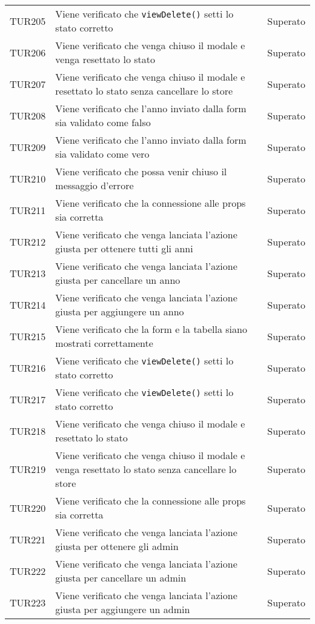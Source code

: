 \documentclass[PianoDiQualifica.tex]{subfiles}
\begin{document}
\begin{longtable}[H]{P{2cm}P{8.5cm}P{3cm}}
	TUR205 & Viene verificato che \texttt{viewDelete()} setti lo stato corretto & Superato \\
	TUR206 & Viene verificato che venga chiuso il modale e venga resettato lo stato & Superato \\
	TUR207 & Viene verificato che venga chiuso il modale e resettato lo stato senza cancellare lo store & Superato \\
	TUR208 & Viene verificato che l'anno inviato dalla form sia validato come falso & Superato \\
	TUR209 & Viene verificato che l'anno inviato dalla form sia validato come vero & Superato \\
	TUR210 & Viene verificato che possa venir chiuso il messaggio d'errore & Superato \\
	TUR211 & Viene verificato che la connessione alle props sia corretta & Superato \\
	TUR212 & Viene verificato che venga lanciata l'azione giusta per ottenere tutti gli anni & Superato \\
	TUR213 & Viene verificato che venga lanciata l'azione giusta per cancellare un anno & Superato \\
	TUR214 & Viene verificato che venga lanciata l'azione giusta per aggiungere un anno & Superato \\
	TUR215 & Viene verificato che la form e la tabella siano mostrati correttamente & Superato \\
	TUR216 & Viene verificato che \texttt{viewDelete()} setti lo stato corretto & Superato \\
	TUR217 & Viene verificato che \texttt{viewDelete()} setti lo stato corretto & Superato \\
	TUR218 & Viene verificato che venga chiuso il modale e resettato lo stato & Superato \\
	TUR219 & Viene verificato che venga chiuso il modale e venga resettato lo stato senza cancellare lo store & Superato \\
	TUR220 & Viene verificato che la connessione alle props sia corretta & Superato \\
	TUR221 & Viene verificato che venga lanciata l'azione giusta per ottenere gli admin & Superato \\
	TUR222 & Viene verificato che venga lanciata l'azione giusta per cancellare un admin & Superato \\
	TUR223 & Viene verificato che venga lanciata l'azione giusta per aggiungere un admin & Superato \\


\end{longtable}
\end{document}
